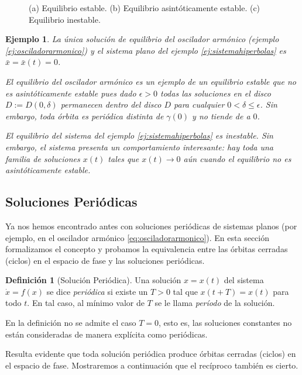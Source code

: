 \documentclass[11pt]{book}
\theoremstyle{definition}
\newtheorem{definition}{Definición}
\numberwithin{definition}{section}
\theoremstyle{theorem}
\numberwithin{theorem}{section}
\numberwithin{lemma}{section}
\numberwithin{corollary}{section}
\theoremstyle{plain}
\newtheorem{example}{Ejemplo}
\numberwithin{example}{section}
\begin{document}
\begin{figure}[!ht]
	\caption{(a) Equilibrio estable. (b) Equilibrio asintóticamente estable. (c) Equilibrio inestable.}
\end{figure}

\begin{example}
La única solución de equilibrio del oscilador armónico (ejemplo \ref{ej:osciladorarmonico}) y el sistema plano del ejemplo \ref{ej:sistemahiperbolas} es $\bar{x} = \bar{x}(t) = 0$.

El equilibrio del oscilador armónico es un ejemplo de un equilibrio estable que no es asintóticamente estable pues dado $\epsilon > 0$ todas las soluciones en el disco $D := D(0, \delta)$ permanecen dentro del disco $D$ para cualquier $0 < \delta \leq \epsilon$. Sin embargo, toda órbita es periódica distinta de $\gamma(0)$ y no tiende de a $0$.

El equilibrio del sistema del ejemplo \ref{ej:sistemahiperbolas} es inestable. Sin embargo, el sistema presenta un comportamiento interesante: hay toda una familia de soluciones $x(t)$ tales que $x(t) \to 0$ aún cuando el equilibrio no es asintóticamente estable.

\end{example}


\subsection{Soluciones Periódicas}

Ya nos hemos encontrado antes con soluciones periódicas de sistemas planos (por ejemplo, en el oscilador armónico \ref{eq:osciladorarmonico}). En esta sección formalizamos el concepto y probamos la equivalencia entre las órbitas cerradas (ciclos) en el espacio de fase y las soluciones periódicas.

\begin{definition}[Solución Periódica] Una solución $x = x(t)$ del sistema $\dot{x} = f(x)$ se dice \emph{periódica} si existe un $T > 0$ tal que $x(t+T) = x(t)$ para todo $t$. En tal caso, al mínimo valor de $T$ se le llama \textit{período} de la solución.
\end{definition}

En la definición no se admite el caso $T=0$, esto es, las soluciones constantes no están consideradas de manera explícita como periódicas.

Resulta evidente que toda solución periódica produce órbitas cerradas (ciclos) en el espacio de fase. Mostraremos a continuación que el recíproco también es cierto.
\end{document}
